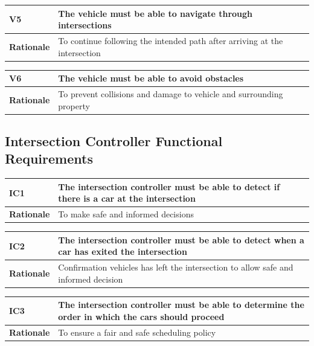 \documentclass [11pt]{article}
\begin{document}
\begin{longtable}{| p{ } | p{ } | }\hline 
\rowcolor{tableCell}\textbf{V5} & The vehicle must be able to navigate through intersections \\ \hline
\textbf{Rationale} & To continue following the intended path after arriving at the intersection \\ \hline 

\end{longtable}

\begin{longtable}{| p{ } | p{ } | }\hline 
\rowcolor{tableCell}\textbf{V6} & The vehicle must be able to avoid obstacles \\ \hline
\textbf{Rationale} &  To prevent collisions and damage to vehicle and surrounding property\\ \hline 

\end{longtable}







\subsection{Intersection Controller Functional Requirements}
\begin{longtable}{| p{ } | p{ } | }\hline 
\rowcolor{tableCell}\textbf{IC1} & The intersection controller must be able to detect if there is a car at the intersection  \\ \hline
\textbf{Rationale} &  To make safe and informed decisions \\ \hline 
\end{longtable}

\begin{longtable}{| p{ } | p{ } | }\hline 
\rowcolor{tableCell}\textbf{IC2} & The intersection controller must be able to detect when a car has exited the intersection \\ \hline
\textbf{Rationale} &  Confirmation vehicles has left the intersection to allow safe and informed decision \\ \hline 
\end{longtable}

\begin{longtable}{| p{ } | p{ } | }\hline 
\rowcolor{tableCell}\textbf{IC3} & The intersection controller must be able to determine the order in which the cars should proceed \\ \hline
\textbf{Rationale} & To ensure a fair and safe scheduling policy \\ \hline 
\end{longtable}
\end{document}
